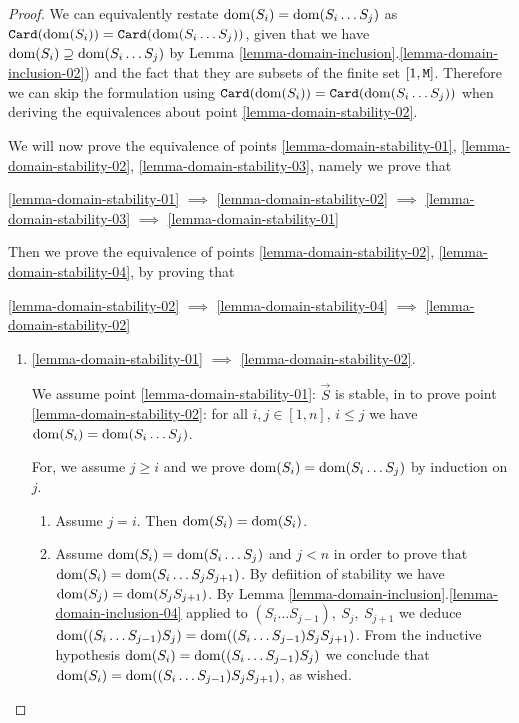 \documentclass{lmcs}
\begin{document}
\begin{proof}
We can equivalently restate ${\rm dom}(S_i) =  {\rm dom}(S_i \ldots S_j)$ as
${\tt Card}({\rm dom}(S_i)) =  {\tt Card}({\rm dom}(S_i \ldots S_j))$, 
given that we have ${\rm dom}(S_i) \supseteq  {\rm dom}(S_i \ldots S_j)$ 
by Lemma \ref{lemma-domain-inclusion}.\ref{lemma-domain-inclusion-02})
and the fact that they are subsets of the finite set $[1,{\tt M}]$.
Therefore we can skip the formulation using 
${\tt Card}({\rm dom}(S_i)) =  {\tt Card}({\rm dom}(S_i \ldots S_j))$
when deriving the equivalences about point \ref{lemma-domain-stability-02}.

We will now prove the equivalence of points 
\ref{lemma-domain-stability-01},
\ref{lemma-domain-stability-02},
\ref{lemma-domain-stability-03},
namely we prove that
\begin{center}
\ref{lemma-domain-stability-01} 
$\implies$ 
\ref{lemma-domain-stability-02}
$\implies$ 
\ref{lemma-domain-stability-03} 
$\implies$ 
\ref{lemma-domain-stability-01}
\end{center}
Then we prove the equivalence of points
\ref{lemma-domain-stability-02},
\ref{lemma-domain-stability-04},
by proving that 
\begin{center}
\ref{lemma-domain-stability-02} $\implies$  
\ref{lemma-domain-stability-04} $\implies$  
\ref{lemma-domain-stability-02}
\end{center}


\begin{enumerate}

\item
\ref{lemma-domain-stability-01} $\implies$ \ref{lemma-domain-stability-02}.

We assume point \ref{lemma-domain-stability-01}: $\vec{S}$ is stable, in to prove 
point \ref{lemma-domain-stability-02}: 
for all $i, j \in [1, n]$, $i \le j$ we have ${\rm dom}(S_i) =  {\rm dom}(S_i \ldots S_j)$.

For, we assume $j \ge i$ and we prove ${\rm dom}(S_i) =  {\rm dom}(S_i \ldots S_j)$ by induction on $j$.
\begin{enumerate}
\item
Assume $j=i$. Then ${\rm dom}(S_i) =  {\rm dom}(S_i)$.
\item
Assume ${\rm dom}(S_i) =  {\rm dom}(S_i \ldots S_j)$ and $j<n$ in order to prove that 
${\rm dom}(S_i) =  {\rm dom}(S_i \ldots S_j S_{j+1})$. By defiition of stability we have 
${\rm dom}(S_j) = {\rm dom}(S_j S_{j+1})$. By Lemma 
\ref{lemma-domain-inclusion}.\ref{lemma-domain-inclusion-04} 
applied to $(S_i \ldots S_{j-1}), \ S_j, \ S_{j+1}$ we deduce 
${\rm dom}( (S_i \ldots S_{j-1}) S_j) = {\rm dom}( (S_i \ldots S_{j-1}) S_j S_{j+1})$.
From the inductive hypothesis ${\rm dom}(S_i) =  {\rm dom}( (S_i \ldots S_{j-1}) S_j)$
we conclude that ${\rm dom}(S_i) =  {\rm dom}((S_i \ldots S_{j-1}) S_j S_{j+1})$, as wished.
\end{enumerate}



\end{enumerate}
\end{proof}
\end{document}
